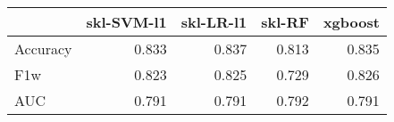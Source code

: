 \begin{tabular}{lrrrr}
\toprule
{} &  skl-SVM-l1 &  skl-LR-l1 &  skl-RF &  xgboost \\
\midrule
Accuracy &       0.833 &      0.837 &   0.813 &    0.835 \\
F1w      &       0.823 &      0.825 &   0.729 &    0.826 \\
AUC      &       0.791 &      0.791 &   0.792 &    0.791 \\
\bottomrule
\end{tabular}
